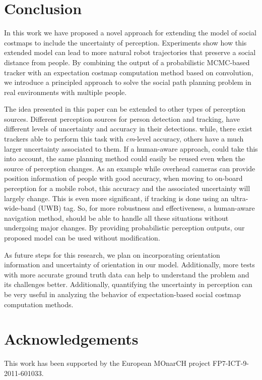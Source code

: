 \section{Conclusion}
\label{sec:conclusion}

In this work we have proposed a novel approach for extending the model of social costmaps to include the uncertainty of perception. Experiments show how this extended model can lead to more natural robot trajectories that preserve a social distance from people. By combining the output of a probabilistic MCMC-based tracker with an expectation costmap computation method based on convolution, we introduce a principled approach to solve the social path planning problem in real environments with multiple people. 

The idea presented in this paper can be extended to other types of perception sources. Different perception sources for person detection and tracking, have different levels of uncertainty and accuracy in their detections. while, there exist trackers able to perform this task with \textit{cm}-level accuracy, others have a much larger uncertainty associated to them. If a human-aware approach, could take this into account, the same planning method could easily be reused even when the source of perception changes. As an example while overhead cameras can provide position information of people with good accuracy, when moving to on-board perception for a mobile robot, this accuracy and the associated uncertainty will largely change. This is even more significant, if tracking is done using an ultra-wide-band (UWB) tag. So, for more robustness and effectiveness, a human-aware navigation method, should be able to handle all these situations without undergoing major changes. By providing probabilistic perception outputs, our proposed model can be used without modification.

As future steps for this research, we plan on incorporating orientation information and uncertainty of orientation in our model. Additionally, more tests with more accurate ground truth data can help to understand the problem and its challenges better. Additionally, quantifying the uncertainty in perception can be very useful in analyzing the behavior of expectation-based social costmap computation methods.  


\section*{Acknowledgements}

This work has been supported by the European MOnarCH project FP7-ICT-9-2011-601033. 